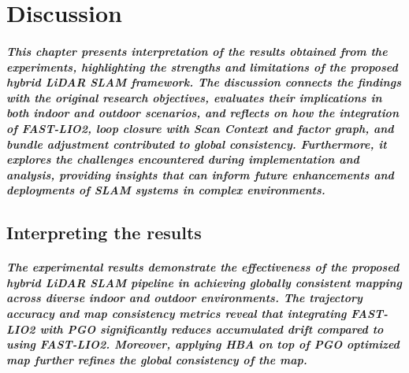 \chapter{Discussion}
\label{chap:discussion}
\paragraph{\textnormal{This chapter presents interpretation of the results obtained from the experiments, highlighting the strengths and limitations of the proposed hybrid LiDAR SLAM framework. The discussion connects the findings with the original research objectives, evaluates their implications in both indoor and outdoor scenarios, and reflects on how the integration of FAST-LIO2, loop closure with Scan Context and factor graph, and bundle adjustment contributed to global consistency. Furthermore, it explores the challenges encountered during implementation and analysis, providing insights that can inform future enhancements and deployments of SLAM systems in complex environments.}}

\section{Interpreting the results}
\paragraph{\textnormal{The experimental results demonstrate the effectiveness of the proposed hybrid LiDAR SLAM pipeline in achieving globally consistent mapping across diverse indoor and outdoor environments. The trajectory accuracy and map consistency metrics reveal that integrating FAST-LIO2 with PGO significantly reduces accumulated drift compared to using FAST-LIO2. Moreover, applying HBA on top of PGO optimized map further refines the global consistency of the map.
}}

